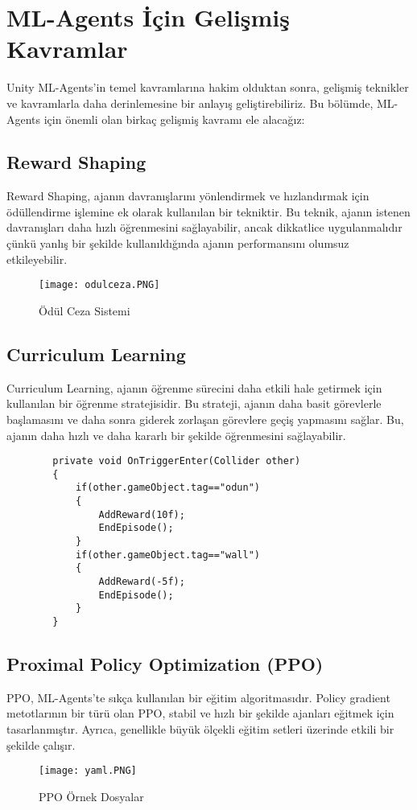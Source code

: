 \documentclass{article}
\begin{document}
    
\section{ML-Agents İçin Gelişmiş Kavramlar}
    Unity ML-Agents'in temel kavramlarına hakim olduktan sonra, gelişmiş teknikler ve kavramlarla daha derinlemesine bir anlayış geliştirebiliriz. Bu bölümde, ML-Agents için önemli olan birkaç gelişmiş kavramı ele alacağız:

    \subsection{Reward Shaping}
        Reward Shaping, ajanın davranışlarını yönlendirmek ve hızlandırmak için ödüllendirme işlemine ek olarak kullanılan bir tekniktir. Bu teknik, ajanın istenen davranışları daha hızlı öğrenmesini sağlayabilir, ancak dikkatlice uygulanmalıdır çünkü yanlış bir şekilde kullanıldığında ajanın performansını olumsuz etkileyebilir.

        \begin{figure}[h]
    \centering
    \texttt{[image: odulceza.PNG]}
    \caption{Ödül Ceza Sistemi}
    \label{fig:resim14}
    \end{figure}
    

    \subsection{Curriculum Learning}
        Curriculum Learning, ajanın öğrenme sürecini daha etkili hale getirmek için kullanılan bir öğrenme stratejisidir. Bu strateji, ajanın daha basit görevlerle başlamasını ve daha sonra giderek zorlaşan görevlere geçiş yapmasını sağlar. Bu, ajanın daha hızlı ve daha kararlı bir şekilde öğrenmesini sağlayabilir.
        \vspace{0,15cm}
        \footnotesize
        \begin{verbatim}
        private void OnTriggerEnter(Collider other)
        {
            if(other.gameObject.tag=="odun")
            {
                AddReward(10f);
                EndEpisode();
            }
            if(other.gameObject.tag=="wall")
            {
                AddReward(-5f);
                EndEpisode();
            }
        }
\end{verbatim}
        \clearpage

    \subsection{Proximal Policy Optimization (PPO)}
        PPO, ML-Agents'te sıkça kullanılan bir eğitim algoritmasıdır. Policy gradient metotlarının bir türü olan PPO, stabil ve hızlı bir şekilde ajanları eğitmek için tasarlanmıştır. Ayrıca, genellikle büyük ölçekli eğitim setleri üzerinde etkili bir şekilde çalışır.
        \begin{figure}[h]
    \centering
    \texttt{[image: yaml.PNG]}
    \caption{PPO Örnek Dosyalar}
    \label{fig:resim15}
\end{figure}
\end{document}
